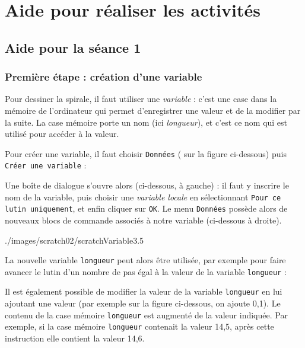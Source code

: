 

\section{Aide pour réaliser les activités}\label{aide_seanceScratch1}

\subsection{Aide pour la séance 1}

\subsubsection{Première étape : création d'une variable}\label{Scratch5eCreationVariable} 
  

Pour dessiner la spirale, il faut utiliser une \emph{variable} : c'est une case dans la mémoire de l'ordinateur qui permet d'enregistrer une valeur et de la modifier par la suite. La case mémoire porte un nom (ici \emph{longueur}), et c'est ce nom qui est utilisé pour accéder à la valeur.

Pour créer une variable, il faut choisir \texttt{Données} ( sur la figure ci-dessous) puis \texttt{Créer une variable}  :


Une boîte de dialogue s'ouvre alors (ci-dessous, à gauche) : il faut y inscrire le nom de la variable, puis choisir une \emph{variable locale} en sélectionnant \texttt{Pour ce lutin uniquement}, et enfin cliquer sur \texttt{OK}. Le menu \texttt{Données} possède alors de nouveaux blocs de commande associés à notre variable (ci-dessous à droite).

%
              {./images/scratch02/scratchVariable3}{.5\textwidth}

La nouvelle variable \texttt{longueur} peut alors être utilisée, par exemple pour faire avancer le lutin d'un nombre de pas égal à la valeur de la variable \texttt{longueur} :


Il est également possible de modifier la valeur de la variable \texttt{longueur} en lui ajoutant une valeur (par exemple sur la figure ci-dessous, on ajoute 0,1). Le contenu de la case mémoire \texttt{longueur} est augmenté de la valeur indiquée. Par exemple, si la case mémoire \texttt{longueur} contenait la valeur 14,5, après cette instruction elle contient la valeur 14,6.    

